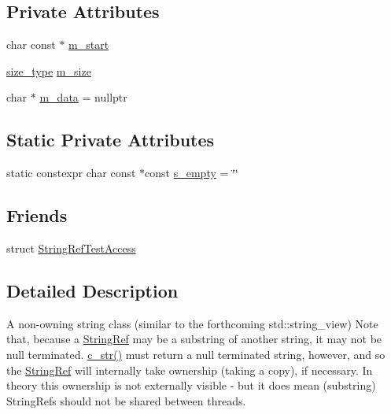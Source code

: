 \subsection*{Private Attributes}
\begin{DoxyCompactItemize}
\item 
char const  $\ast$ \mbox{\hyperlink{class_catch_1_1_string_ref_a0583d4e5ea88c99c121504052a4fcb6c}{m\+\_\+start}}
\item 
\mbox{\hyperlink{class_catch_1_1_string_ref_a06b4db8fc82b197004291cf370b2ba7c}{size\+\_\+type}} \mbox{\hyperlink{class_catch_1_1_string_ref_a91ee253f5b7e43303352186139845753}{m\+\_\+size}}
\item 
char $\ast$ \mbox{\hyperlink{class_catch_1_1_string_ref_ae671eabbedd386aeb334d3da1a904ba5}{m\+\_\+data}} = nullptr
\end{DoxyCompactItemize}
\subsection*{Static Private Attributes}
\begin{DoxyCompactItemize}
\item 
static constexpr char const  $\ast$const \mbox{\hyperlink{class_catch_1_1_string_ref_a38d077e89f7f2ce666507ab28dd28653}{s\+\_\+empty}} = \char`\"{}\char`\"{}
\end{DoxyCompactItemize}
\subsection*{Friends}
\begin{DoxyCompactItemize}
\item 
struct \mbox{\hyperlink{class_catch_1_1_string_ref_a420e64e1652de1b0d427775781b018f5}{String\+Ref\+Test\+Access}}
\end{DoxyCompactItemize}


\subsection{Detailed Description}
A non-\/owning string class (similar to the forthcoming std\+::string\+\_\+view) Note that, because a \mbox{\hyperlink{class_catch_1_1_string_ref}{String\+Ref}} may be a substring of another string, it may not be null terminated. \mbox{\hyperlink{class_catch_1_1_string_ref_a1669cb2765e820ca258159676cbd82a5}{c\+\_\+str()}} must return a null terminated string, however, and so the \mbox{\hyperlink{class_catch_1_1_string_ref}{String\+Ref}} will internally take ownership (taking a copy), if necessary. In theory this ownership is not externally visible -\/ but it does mean (substring) String\+Refs should not be shared between threads. 

